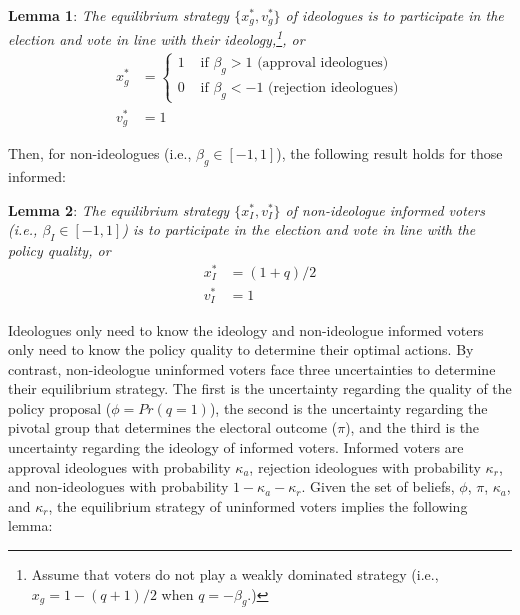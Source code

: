 \documentclass[letterpaper, 12pt]{article}
\begin{document}
    \noindent \textbf{Lemma 1}: \textit{The equilibrium strategy $\{x^*_g, v^*_g\}$ of ideologues is to participate in the election and vote in line with their ideology,\footnote{Assume that voters do not play a weakly dominated strategy (i.e., $x_g=1-(q+1)/2$ when $q = - \beta_g$.)}, or} 
    \begin{align}
    x^*_g &= \begin{cases}
    1 &\text{ if } \beta_g > 1 \text{ (approval ideologues)}\\
    0 &\text{ if } \beta_g < -1 \text{ (rejection ideologues)}
    \end{cases} \\
    v^*_g &= 1
    \end{align}
    
    \noindent Then, for non-ideologues (i.e., $\beta_g \in [-1, 1]$), the following result holds for those informed: 
    
    \noindent \textbf{Lemma 2}: \textit{The equilibrium strategy $\{x^*_I, v^*_I\}$ of non-ideologue informed voters (i.e., $\beta_I \in [-1, 1]$) is to participate in the election and vote in line with the policy quality, or} 
    \begin{align}
    x^*_I &= (1 + q)/2 \\ 
    v^*_I &= 1
    \end{align}
    
    \par Ideologues only need to know the ideology and non-ideologue informed voters only need to know the policy quality to determine their optimal actions. By contrast, non-ideologue uninformed voters face three uncertainties to determine their equilibrium strategy. The first is the uncertainty regarding the quality of the policy proposal ($\phi = Pr(q=1)$), the second is the uncertainty regarding the pivotal group that determines the electoral outcome ($\pi$), and the third is the uncertainty regarding the ideology of informed voters. Informed voters are approval ideologues with probability $\kappa_{a}$, rejection ideologues with probability $\kappa_{r}$, and non-ideologues with probability $1 - \kappa_{a} - \kappa_{r}$. Given the set of beliefs, $\phi$, $\pi$, $\kappa_{a}$, and $\kappa_{r}$, the equilibrium strategy of uninformed voters implies the following lemma:
    
\end{document}

